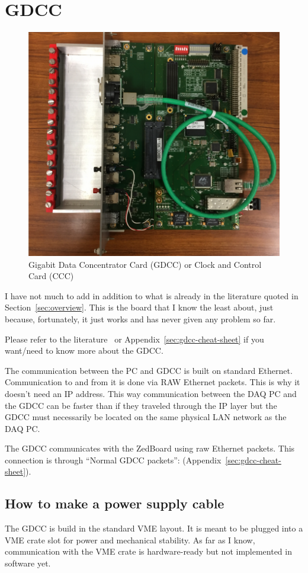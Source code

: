 \section{GDCC}
\begin{figure}[H]
  \centering \includegraphics[width=0.7\linewidth, frame]{GDCC}
  \caption{Gigabit Data Concentrator Card (GDCC) or Clock and Control Card
    (CCC)}
\end{figure}
I have not much to add in addition to what is already in the literature quoted
in Section~\ref{sec:overview}. This is the board that I know the least about,
just because, fortunately, it just works and has never given any problem so far.

Please refer to the literature~\cite{GDCC:2012} or
Appendix~\ref{sec:gdcc-cheat-sheet} if you want/need to know more about the
GDCC.

The communication between the PC and GDCC is built on standard
Ethernet. Communication to and from it is done via RAW Ethernet packets. This is
why it doesn't need an IP address. This way communication between the DAQ PC and
the GDCC can be faster than if they traveled through the IP layer but the GDCC
must necessarily be located on the same physical LAN network as the DAQ PC.

The GDCC communicates with the ZedBoard using raw Ethernet packets. This
connection is through ``Normal GDCC packets'': 
(Appendix~\ref{sec:gdcc-cheat-sheet}).

\subsection{How to make a power supply cable}
The GDCC is build in the standard VME layout. It is meant to be plugged into a
VME crate slot for power and mechanical stability. As far as I know,
communication with the VME crate is hardware-ready but not implemented in
software yet.

